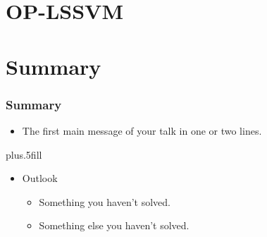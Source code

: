 \documentclass{beamer}
\begin{document}
\section{OP-LSSVM}


\section*{Summary}

\begin{frame}
\frametitle<presentation>{Summary}

\begin{itemize}
  \item The \alert{first main message} of your talk in one or two lines.
\end{itemize}

\vskip0pt plus.5fill
\begin{itemize}
  \item Outlook
  \begin{itemize}
    \item Something you haven't solved.
    \item Something else you haven't solved.
  \end{itemize}
\end{itemize}
\end{frame}
\end{document}
